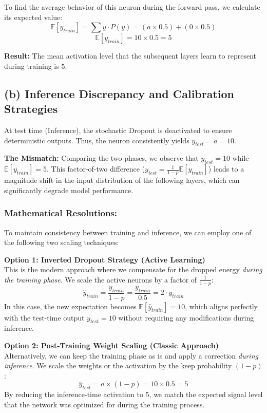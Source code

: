 \documentclass{article}
\begin{document}
To find the average behavior of this neuron during the forward pass, we calculate its expected value:
\[
\mathbb{E}[y_{train}] = \sum y \cdot P(y) = (a \times 0.5) + (0 \times 0.5)
\]
\[
\mathbb{E}[y_{train}] = 10 \times 0.5 = 5
\]

\textbf{Result:} The mean activation level that the subsequent layers learn to represent during training is $\boxed{5}$.

\subsection{(b) Inference Discrepancy and Calibration Strategies}

At test time (Inference), the stochastic Dropout is deactivated to ensure deterministic outputs. Thus, the neuron consistently yields $y_{test} = a = 10$.

\textbf{The Mismatch:}
Comparing the two phases, we observe that $y_{test} = 10$ while $\mathbb{E}[y_{train}] = 5$. This factor-of-two difference ($y_{test} = \frac{1}{1-p} \mathbb{E}[y_{train}]$) leads to a magnitude shift in the input distribution of the following layers, which can significantly degrade model performance.

\subsubsection*{Mathematical Resolutions:}
To maintain consistency between training and inference, we can employ one of the following two scaling techniques:

\vspace{0.3cm}
\noindent \textbf{Option 1: Inverted Dropout Strategy (Active Learning)} \\
This is the modern approach where we compensate for the dropped energy \textit{during the training phase}. We scale the active neurons by a factor of $\frac{1}{1-p}$:
\[
\hat{y}_{train} = \frac{y_{train}}{1-p} = \frac{y_{train}}{0.5} = 2 \cdot y_{train}
\]
In this case, the new expectation becomes $\mathbb{E}[\hat{y}_{train}] = 10$, which aligns perfectly with the test-time output $y_{test} = 10$ without requiring any modifications during inference.

\vspace{0.3cm}
\noindent \textbf{Option 2: Post-Training Weight Scaling (Classic Approach)} \\
Alternatively, we can keep the training phase as is and apply a correction \textit{during inference}. We scale the weights or the activation by the keep probability $(1-p)$:
\[
\hat{y}_{test} = a \times (1-p) = 10 \times 0.5 = 5
\]
By reducing the inference-time activation to 5, we match the expected signal level that the network was optimized for during the training process.
\end{document}
